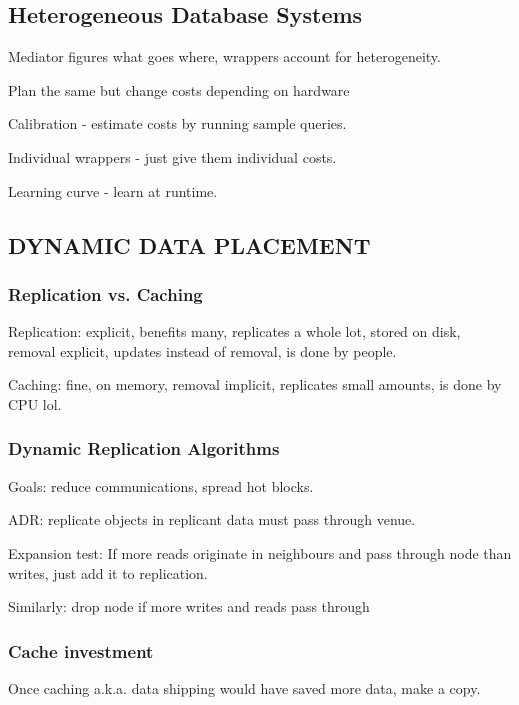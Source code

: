\documentclass{article}
\begin{document}
	\subsection{Heterogeneous Database Systems}
	
		Mediator figures what goes where, wrappers account for heterogeneity.
		
		Plan the same but change costs depending on hardware
		
		Calibration - estimate costs by running sample queries.
		
		Individual wrappers - just give them individual costs.
		
		Learning curve - learn at runtime.
		
		\subsection{DYNAMIC DATA PLACEMENT}
		
			\subsubsection{ Replication vs. Caching}
			
				Replication: explicit, benefits many, replicates a whole lot, stored on disk, removal explicit, updates instead of removal, is done by people.
				
				Caching: fine, on memory, removal implicit, replicates small amounts, is done by CPU lol.
				
			\subsubsection{Dynamic Replication Algorithms}
			
				Goals: reduce communications, spread hot blocks.
				
				ADR: replicate objects in replicant data must pass through venue.
				
				Expansion test: If more reads originate in neighbours and pass through node than writes, just add it to replication.
				
				Similarly: drop node if more writes and reads pass through
				
			\subsubsection{Cache investment}
			
				Once caching a.k.a. data shipping would have saved more data, make a copy.
				
\end{document}
